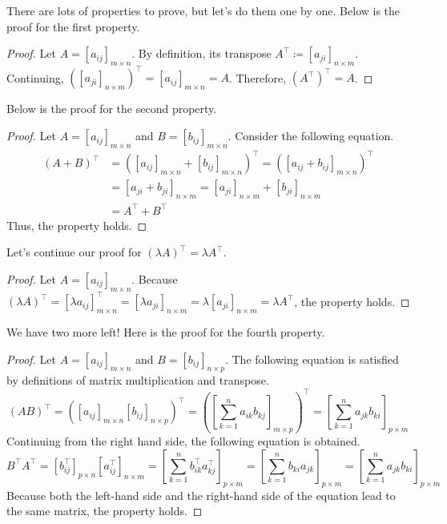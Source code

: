 \documentclass[../main.tex]{subfiles}
\begin{document}
There are lots of properties to prove, but let's do them one by one.
Below is the proof for the first property.

\begin{proof}
Let $A = [a_{ij}]_{m \times n}$. By definition, its transpose
$A^\intercal \coloneqq [a_{ji}]_{n \times m}$. Continuing,
$\left( [a_{ji}]_{n \times m} \right)^\intercal =
[a_{ij}]_{m \times n} = A$. Therefore, $(A^\intercal)^\intercal = A$.
\end{proof}

Below is the proof for the second property.

\begin{proof}
Let $A = [a_{ij}]_{m \times n}$ and $B = [b_{ij}]_{m \times n}$.
Consider the following equation.
\begin{align*}
(A + B)^\intercal
&= \left(
    [a_{ij}]_{m \times n} + [b_{ij}]_{m \times n}
\right)^\intercal
= \left(
    [a_{ij} + b_{ij}]_{m \times n}
\right)^\intercal \\
&= [a_{ji} + b_{ji}]_{n \times m}
= [a_{ji}]_{n \times m} + [b_{ji}]_{n \times m} \\
&= A^\intercal + B^\intercal
\end{align*}
Thus, the property holds.
\end{proof}

Let's continue our proof for $(\lambda A)^\intercal =
\lambda A^\intercal$.

\begin{proof}
Let $A = [a_{ij}]_{m \times n}$. Because
$(\lambda A)^\intercal
= [\lambda a_{ij}]_{m \times n}^\intercal
= [\lambda a_{ji}]_{n \times m}
= \lambda [a_{ji}]_{n \times m}
= \lambda A^\intercal$, the property holds.
\end{proof}

We have two more left! Here is the proof for the fourth property.

\begin{proof}
Let $A = [a_{ij}]_{m \times n}$ and $B = [b_{ij}]_{n \times p}$.
The following equation is satisfied by definitions of matrix
multiplication and transpose.
\[
(AB)^\intercal
= \left(
    [a_{ij}]_{m \times n} [b_{ij}]_{n \times p}
\right)^\intercal
= \left(
    \left[ \sum_{k = 1}^{n} a_{ik} b_{kj} \right]_{m \times p}
\right)^\intercal
= \left[ \sum_{k = 1}^{n} a_{jk} b_{ki} \right]_{p \times m}
\]
Continuing from the right hand side, the following equation is
obtained.
\[
B^\intercal A^\intercal
= \left[ b_{ij}^\intercal \right]_{p \times n}
    \left[ a_{ij}^\intercal \right]_{n \times m}
= \left[
    \sum_{k = 1}^{n} b_{ik}^\intercal a_{kj}^\intercal
\right]_{p \times m}
= \left[ \sum_{k = 1}^{n} b_{ki} a_{jk} \right]_{p \times m}
= \left[ \sum_{k = 1}^{n} a_{jk} b_{ki} \right]_{p \times m}
\]
Because both the left-hand side and the right-hand side of the
equation lead to the same matrix, the property holds.
\end{proof}
\end{document}
